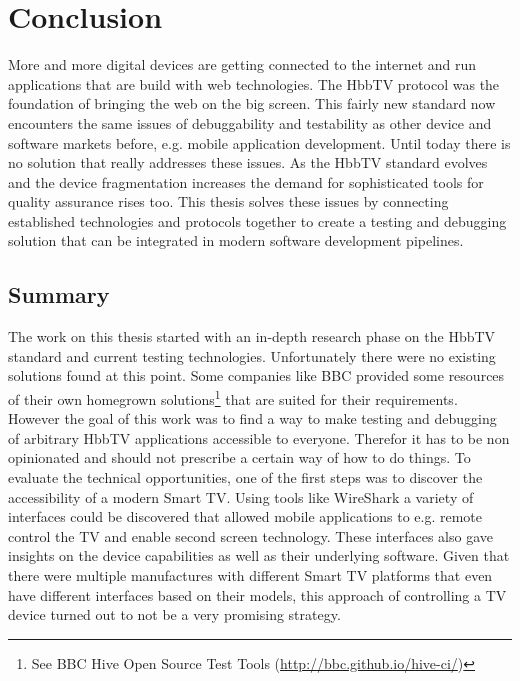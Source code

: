 \chapter{Conclusion\label{cha:chapter7}}

%

More and more digital devices are getting connected to the internet and run applications that are build with web
technologies. The HbbTV protocol was the foundation of bringing the web on the big screen. This fairly new standard
now encounters the same issues of debuggability and testability as other device and software markets before, e.g.
mobile application development. Until today there is no solution that really addresses these issues. As the HbbTV
standard evolves and the device fragmentation increases the demand for sophisticated tools for quality assurance
rises too. This thesis solves these issues by connecting established technologies and protocols together to create
a testing and debugging solution that can be integrated in modern software development pipelines.

\section{Summary\label{sec:summary}}


The work on this thesis started with an in-depth research phase on the HbbTV standard and current testing technologies.
Unfortunately there were no existing solutions found at this point. Some companies like BBC provided some resources
of their own homegrown solutions\footnote{See BBC Hive Open Source Test Tools (\url{http://bbc.github.io/hive-ci/})}
that are suited for their requirements. However the goal of this work was to find a way to make testing and debugging
of arbitrary HbbTV applications accessible to everyone. Therefor it has to be non opinionated and should not prescribe
a certain way of how to do things. To evaluate the technical opportunities, one of the first steps was to discover
the accessibility of a modern Smart TV. Using tools like WireShark a variety of interfaces could be discovered that
allowed mobile applications to e.g. remote control the TV and enable second screen technology. These interfaces also
gave insights on the device capabilities as well as their underlying software. Given that there were multiple
manufactures with different Smart TV platforms that even have different interfaces based on their models, this approach
of controlling a TV device turned out to not be a very promising strategy.

